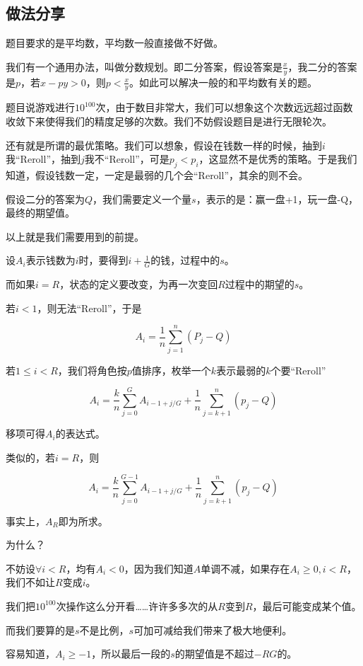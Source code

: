 \documentclass{ctexart}
\begin{document}
		\subsection{做法分享}
			题目要求的是平均数，平均数一般直接做不好做。

			我们有一个通用办法，叫做分数规划。即二分答案，假设答案是$\frac{x}{y}$，我二分的答案是$p$，若$x-py>0$，则$p<\frac{x}{y}$。如此可以解决一般的和平均数有关的题。

			题目说游戏进行$10^{100}$次，由于数目非常大，我们可以想象这个次数远远超过函数收敛下来使得我们的精度足够的次数。我们不妨假设题目是进行无限轮次。

			还有就是所谓的最优策略。我们可以想象，假设在钱数一样的时候，抽到$i$我``Reroll''，抽到$j$我不``Reroll''，可是$p_j<p_i$，这显然不是优秀的策略。于是我们知道，假设钱数一定，一定是最弱的几个会``Reroll''，其余的则不会。

			假设二分的答案为$Q$，我们需要定义一个量$s$，表示的是：赢一盘+1，玩一盘-Q，最终的期望值。

			以上就是我们需要用到的前提。

			设$A_i$表示钱数为$i$时，要得到$i+\frac{1}{G}$的钱，过程中的$s$。

			而如果$i=R$，状态的定义要改变，为再一次变回$R$过程中的期望的$s$。

			若$i<1$，则无法``Reroll''，于是
	
			\[A_i=\frac{1}{n}\sum_{j=1}^n (P_j-Q)\]

			若$1 \le i < R$，我们将角色按$p$值排序，枚举一个$k$表示最弱的$k$个要``Reroll''
	
			\[A_i=\frac{k}{n}\sum_{j=0}^G A_{i-1+j/G}+\frac{1}{n}\sum_{j=k+1}^n(p_j-Q)\]

			移项可得$A_i$的表达式。

			类似的，若$i=R$，则

			\[A_i=\frac{k}{n}\sum_{j=0}^{G-1} A_{i-1+j/G}+\frac{1}{n}\sum_{j=k+1}^n(p_j-Q)\]

			事实上，$A_R$即为所求。

			为什么？

			不妨设$\forall i<R$，均有$A_i<0$，因为我们知道$A$单调不减，如果存在$A_i \ge 0 ,i<R$，我们不如让$R$变成$i$。

			我们把$10^{100}$次操作这么分开看……许许多多次的从$R$变到$R$，最后可能变成某个值。

			而我们要算的是$s$不是比例，$s$可加可减给我们带来了极大地便利。

			容易知道，$A_i \ge -1$，所以最后一段的$s$的期望值是不超过$-RG$的。
\end{document}
